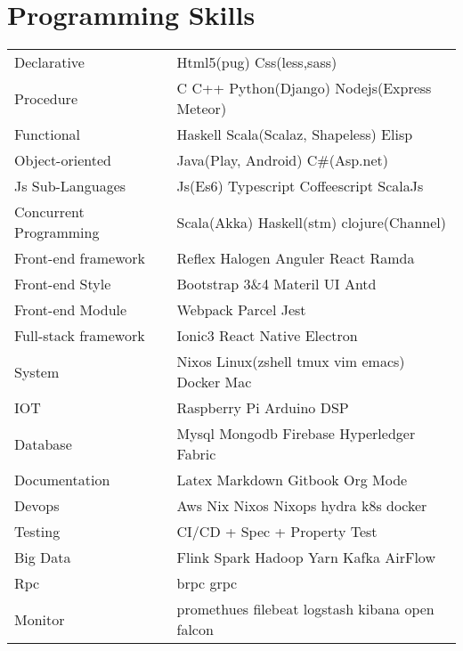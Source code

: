 \documentclass[11pt]{article}
\begin{document}
\section{Programming Skills}
\label{sec:orgc5bbe41}
\begin{center}
\begin{tabular}{lp{}}
Declarative & Html5(pug) Css(less,sass)\\
Procedure & C C++ Python(Django) Nodejs(Express Meteor)\\
Functional & Haskell Scala(Scalaz, Shapeless) Elisp\\
Object-oriented & Java(Play, Android) C\#(Asp.net)\\
Js Sub-Languages & Js(Es6) Typescript Coffeescript ScalaJs\\
Concurrent Programming & Scala(Akka) Haskell(stm) clojure(Channel)\\
Front-end framework & Reflex Halogen Anguler React Ramda\\
Front-end Style & Bootstrap 3\&4 Materil UI Antd\\
Front-end Module & Webpack Parcel Jest\\
Full-stack framework & Ionic3 React Native Electron\\
System & Nixos Linux(zshell tmux vim emacs) Docker Mac\\
IOT & Raspberry Pi Arduino DSP\\
Database & Mysql Mongodb Firebase Hyperledger Fabric\\
Documentation & Latex Markdown Gitbook Org Mode\\
Devops & Aws Nix Nixos Nixops hydra k8s docker\\
Testing & CI/CD + Spec + Property Test\\
Big Data & Flink Spark Hadoop Yarn Kafka AirFlow\\
Rpc & brpc grpc\\
Monitor & promethues filebeat logstash kibana open falcon\\
\end{tabular}
\end{center}
\end{document}
